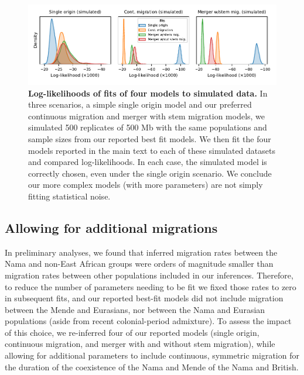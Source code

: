 \documentclass[]{article}
\begin{document}
\begin{figure}[ht!]
    \centering
    \includegraphics{./figures/supp-refit-lls.pdf}
    \caption{
        \textbf{Log-likelihoods of fits of four models to simulated data.} In
        three scenarios, a simple single origin model and our preferred
        continuous migration and merger with stem migration models, we
        simulated 500 replicates of 500 Mb with the same populations and sample
        sizes from our reported best fit models. We then fit the four models
        reported in the main text to each of these simulated datasets and
        compared log-likelihoods. In each case, the simulated model is
        correctly chosen, even under the single origin scenario. We conclude
        our more complex models (with more parameters) are not simply fitting
        statistical noise.
    }
    \label{fig:refit-lls}
\end{figure}


\subsection{Allowing for additional migrations}

In preliminary analyses, we found that inferred migration rates between the
Nama and non-East African groups were orders of magnitude smaller than
migration rates between other populations included in our inferences.
Therefore, to reduce the number of parameters needing to be fit we fixed those
rates to zero in subsequent fits, and our reported best-fit models did not
include migration between the Mende and Eurasians, nor between the Nama and
Eurasian populations (aside from recent colonial-period admixture). To assess
the impact of this choice, we re-inferred four of our reported models (single
origin, continuous migration, and merger with and without stem migration),
while allowing for additional parameters to include continuous, symmetric
migration for the duration of the coexistence of the Nama and Mende of the Nama
and British.
\end{document}
